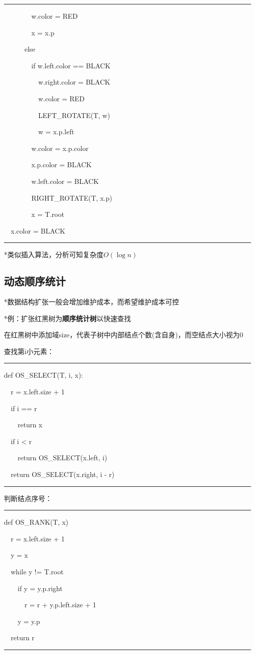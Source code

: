 \documentclass[a4paper,UTF8,fontset=windows]{ctexart}
\newenvironment{code}{\rule{36em}{0.1em}\setlength{\parindent}{1em}

}{

\setlength{\parindent}{0em}\rule{36em}{0.1em}}
\begin{document}
\begin{code}
\ \ \ \ \ \ \ \ w.color = RED

\ \ \ \ \ \ \ \ x = x.p

\ \ \ \ \ \ else

\ \ \ \ \ \ \ \ if w.left.color == BLACK

\ \ \ \ \ \ \ \ \ \ w.right.color = BLACK

\ \ \ \ \ \ \ \ \ \ w.color = RED

\ \ \ \ \ \ \ \ \ \ LEFT\_ROTATE(T, w)

\ \ \ \ \ \ \ \ \ \ w = x.p.left

\ \ \ \ \ \ \ \ w.color = x.p.color

\ \ \ \ \ \ \ \ x.p.color = BLACK

\ \ \ \ \ \ \ \ w.left.color = BLACK

\ \ \ \ \ \ \ \ RIGHT\_ROTATE(T, x.p)

\ \ \ \ \ \ \ \ x = T.root

\ \ x.color = BLACK

\end{code}

*\hspace{0em}类似插入算法，分析可知复杂度$O(\log n)$

\subsection{动态顺序统计}

*\hspace{0em}数据结构扩张一般会增加维护成本，而希望维护成本可控

*\hspace{0em}例：扩张红黑树为\textbf{顺序统计树}以快速查找

在红黑树中添加域size，代表子树中内部结点个数(含自身)，而空结点大小视为0

查找第i小元素：

\begin{code}
def OS\_SELECT(T, i, x):

\ \ r = x.left.size + 1

\ \ if i == r

\ \ \ \ return x

\ \ if i < r

\ \ \ \ return OS\_SELECT(x.left, i)

\ \ return OS\_SELECT(x.right, i - r)
\end{code}

判断结点序号：

\begin{code}
def OS\_RANK(T, x)

\ \ r = x.left.size + 1

\ \ y = x

\ \ while y != T.root

\ \ \ \ if y = y.p.right

\ \ \ \ \ \ r = r + y.p.left.size + 1

\ \ \ \ y = y.p

\ \ return r
\end{code}
\end{document}
